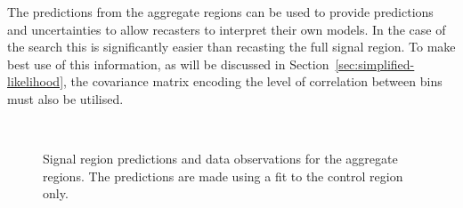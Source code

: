 The predictions from the aggregate regions can be used to provide predictions and uncertainties
to allow recasters to interpret their own models. In the case of the \alphat search
this is significantly easier than recasting the full signal region. To make best use of this information, 
as will be discussed in Section~\ref{sec:simplified-likelihood}, 
the covariance matrix encoding the level of correlation between bins must also be utilised.
\clearpage
\begin{figure}[!tbhp]
    \caption{ Signal region predictions and data observations for the aggregate regions. 
    The predictions are made using a fit to the control region only. \label{fig:aggFitResult} }
  \begin{center}
     ~~
     \\

\end{center}
\end{figure}
